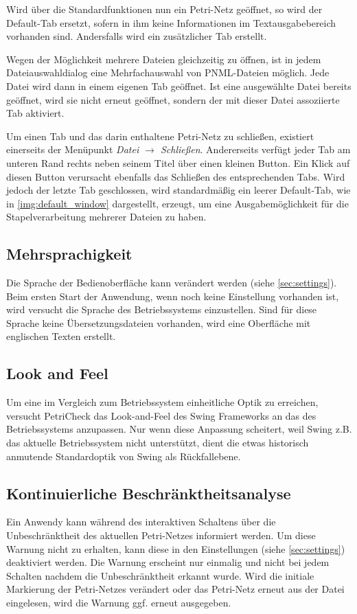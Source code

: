Wird über die Standardfunktionen nun ein Petri-Netz geöffnet, so wird der
Default-Tab ersetzt, sofern in ihm keine Informationen im Textausgabebereich
vorhanden sind. Andersfalls wird ein zusätzlicher Tab erstellt.

Wegen der Möglichkeit mehrere Dateien gleichzeitig zu öffnen, ist in jedem
Dateiauswahldialog eine Mehrfachauswahl von PNML-Dateien möglich. Jede Datei
wird dann in einem eigenen Tab geöffnet. Ist eine ausgewählte Datei bereits
geöffnet, wird sie nicht erneut geöffnet, sondern der mit dieser Datei
assoziierte Tab aktiviert.

Um einen Tab und das darin enthaltene Petri-Netz zu schließen, existiert
einerseits der Menüpunkt \emph{Datei $\rightarrow$ Schließen}. Andererseits
verfügt jeder Tab am unteren Rand rechts neben seinem Titel über einen kleinen
Button. Ein Klick auf diesen Button verursacht ebenfalls das Schließen des
entsprechenden Tabs. Wird jedoch der letzte Tab geschlossen, wird standardmäßig
ein leerer Default-Tab, wie in \cref{img:default_window} dargestellt, erzeugt,
um eine Ausgabemöglichkeit für die Stapelverarbeitung mehrerer Dateien zu haben.

\subsection{Mehrsprachigkeit}
Die Sprache der Bedienoberfläche kann verändert werden (siehe
\cref{sec:settings}). Beim ersten Start der Anwendung, wenn noch keine
Einstellung vorhanden ist, wird versucht die Sprache des Betriebssystems
einzustellen. Sind für diese Sprache keine Übersetzungsdateien vorhanden, wird
eine Oberfläche mit englischen Texten erstellt.

\subsection{Look and Feel}
Um eine im Vergleich zum Betriebssystem einheitliche Optik zu erreichen,
versucht PetriCheck das Look-and-Feel des Swing Frameworks an das des
Betriebssystems anzupassen. Nur wenn diese Anpassung scheitert, weil Swing z.B.
das aktuelle Betriebssystem nicht unterstützt, dient die etwas historisch
anmutende Standardoptik von Swing als Rückfallebene.

\subsection{Kontinuierliche Beschränktheitsanalyse}
Ein Anwendy kann während des interaktiven Schaltens über die Unbeschränktheit
des aktuellen Petri-Netzes informiert werden. Um diese Warnung nicht zu
erhalten, kann diese in den Einstellungen (siehe \cref{sec:settings})
deaktiviert werden. Die Warnung erscheint nur einmalig und nicht bei jedem
Schalten nachdem die Unbeschränktheit erkannt wurde. Wird die initiale
Markierung der Petri-Netzes verändert oder das Petri-Netz erneut aus der Datei
eingelesen, wird die Warnung ggf. erneut ausgegeben.


